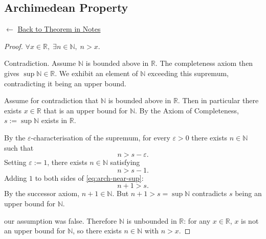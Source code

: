 
\subsection*{Archimedean Property}
\label{prf:archimedean-property}

\begin{remark*}[Return]
$\leftarrow$ \hyperref[thm:archimedean-property]{Back to Theorem in Notes}
\end{remark*}

\begin{proof}
\Claim $\forall x \in \mathbb{R},\; \exists n \in \mathbb{N},\; n > x$.

\Strategy Contradiction.
Assume $\mathbb{N}$ is bounded above in $\mathbb{R}$.
The completeness axiom then gives $\sup \mathbb{N} \in \mathbb{R}$.
We exhibit an element of $\mathbb{N}$ exceeding this supremum,
contradicting it being an upper bound.

\medskip
Assume for contradiction that $\mathbb{N}$ is bounded above in $\mathbb{R}$.
Then in particular there exists $x \in \mathbb{R}$ that is an upper bound
for $\mathbb{N}$.
By the Axiom of Completeness, $s := \sup \mathbb{N}$ exists in $\mathbb{R}$.

By the $\varepsilon$-characterisation of the supremum, for every
$\varepsilon > 0$ there exists $n \in \mathbb{N}$ such that
\[
  n > s - \varepsilon.
\]
Setting $\varepsilon := 1$, there exists $n \in \mathbb{N}$ satisfying
\begin{equation}
\label{eq:arch-near-sup}
  n > s - 1.
\end{equation}
Adding $1$ to both sides of \eqref{eq:arch-near-sup}:
\[
  n + 1 > s.
\]
By the successor axiom, $n + 1 \in \mathbb{N}$.
But $n + 1 > s = \sup \mathbb{N}$ contradicts $s$ being an upper bound
for $\mathbb{N}$.

\Hence our assumption was false.
Therefore $\mathbb{N}$ is unbounded in $\mathbb{R}$:
for any $x \in \mathbb{R}$, $x$ is not an upper bound for $\mathbb{N}$,
so there exists $n \in \mathbb{N}$ with $n > x$. \AsReq
\end{proof}

